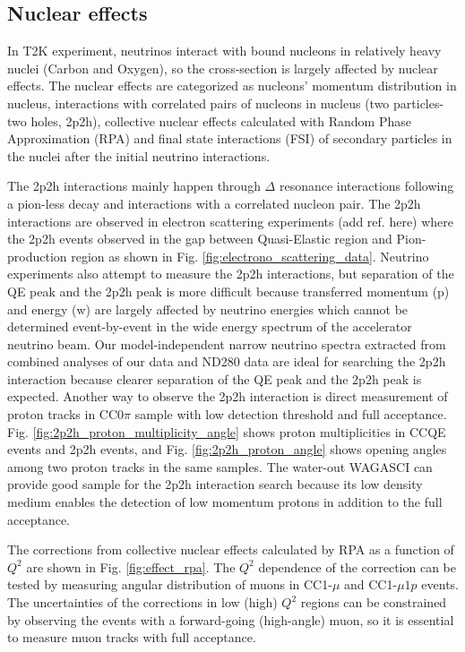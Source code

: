 \subsection{Nuclear effects}
In T2K experiment, neutrinos interact with bound nucleons in relatively heavy nuclei (Carbon and Oxygen), so the cross-section is largely affected by nuclear effects.
The nuclear effects are categorized as nucleons' momentum distribution in nucleus, interactions with  correlated pairs of nucleons in nucleus (two particles-two holes, 2p2h), collective nuclear effects calculated with Random Phase Approximation (RPA) and final state interactions (FSI) of secondary particles in the nuclei after the initial neutrino interactions.


The 2p2h interactions mainly happen through $\Delta$ resonance interactions following a pion-less decay and interactions with a correlated nucleon pair.
The 2p2h interactions are observed in electron scattering experiments (add ref. here) where the 2p2h events observed in the gap between Quasi-Elastic region and Pion-production region as shown in Fig. \ref{fig:electrono_scattering_data}.
Neutrino experiments also attempt to measure the 2p2h interactions, but separation of the QE peak and the 2p2h peak is more difficult because transferred momentum (p) and energy (w) are largely affected by  neutrino energies which cannot be determined event-by-event in the wide energy spectrum of the accelerator neutrino beam.
Our model-independent narrow neutrino spectra extracted from combined analyses of our data and ND280 data are ideal for searching the 2p2h interaction because clearer separation of the QE peak and the 2p2h peak is expected.
Another way to observe the 2p2h interaction is direct measurement of proton tracks in CC0$\pi$ sample with low detection threshold and full acceptance.
Fig. \ref{fig:2p2h_proton_multiplicity_angle} shows proton multiplicities in CCQE events and 2p2h events, and Fig. \ref{fig:2p2h_proton_angle} shows opening angles among two proton tracks in the same samples.
The water-out WAGASCI can provide good sample for the 2p2h interaction search because its low density medium enables the detection of low momentum protons in addition to the full acceptance.


The corrections from collective nuclear effects calculated by RPA as a function of $Q^{2}$ are shown in Fig. \ref{fig:effect_rpa}.
The $Q^{2}$ dependence of the correction can be tested by measuring angular distribution of muons in CC1-$\mu$ and CC1-$\mu 1p$ events.
The uncertainties of the corrections in low (high) $Q^{2}$ regions can be constrained by observing the events with a forward-going (high-angle) muon, so it is essential to measure muon tracks with full acceptance.


